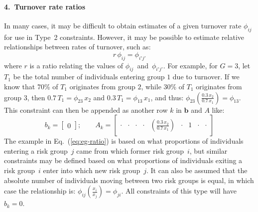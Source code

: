 \paragraph{4.~Turnover rate ratios}
\label{con:rel-turnover}
In many cases, it may be difficult to
obtain estimates of a given turnover rate $\phi_{ij}$
for use in Type~2 constraints.
However, it may be possible to estimate
relative relationships between rates of turnover,
such as:
\begin{equation}\label{eq:ratio}
r\,\phi_{ij} = \phi_{i'j'}
\end{equation}
where $r$ is a ratio relating the values of $\phi_{ij}$~and~$\phi_{i'j'}$.
For example, for $G = 3$,
let $T_1$ be the total number of individuals entering group $1$ due to turnover.
If we know that
70\% of $T_1$ originates from group $2$, while
30\% of $T_1$ originates from group $3$,
then $0.7\,T_1 = \phi_{23} \, x_2$ and $0.3\,T_1 = \phi_{13} \, x_1$,
and thus: $\phi_{23} \left(\frac{0.3\,x_2}{0.7\,x_1}\right) = \phi_{13}$.
This constraint can then be appended as another row $k$ in $\bm{b}$ and $A$ like:
\begin{equation}\label{eq:eg-ratio}
b_k = \left[\begin{array}{c}
0
\end{array}\right];\qquad
A_k = \left[\begin{array}{ccccccccc}
  \cdot & \cdot & \cdot & \cdot & \left(\frac{0.3\,x_2}{0.7\,x_1}\right) & \cdot & 1 & \cdot & \cdot
\end{array}\right] 
\end{equation}
The example in Eq.~(\ref{eq:eg-ratio}) is based on
what proportions of individuals entering a risk group~$j$
came from which former risk group~$i$,
but similar constraints may be defined based on
what proportions of individuals exiting a risk group~$i$
enter into which new risk group~$j$.
It can also be assumed that
the absolute number of individuals moving between two risk groups is equal,
in which case the relationship is:
$\phi_{ij} \left(\frac{x_i}{x_j}\right) = \phi_{ji}$.
All constraints of this type will have $b_k = 0$.
